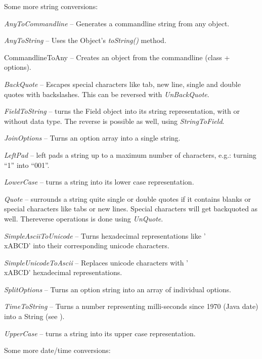 Some more string conversions:
\begin{tight_itemize}
	\item \textit{AnyToCommandline} -- Generates a commandline string from any
	object.
	\item \textit{AnyToString} -- Uses the Object's \textit{toString()} method.
	\item CommandlineToAny -- Creates an object from the commandline (class +
	options).
	\item \textit{BackQuote} -- Escapes special characters like tab, new line, 
	single and double quotes with backslashes. This can be reversed with 
	\textit{UnBackQuote}.
	\item \textit{FieldToString} -- turns the Field object into its string
	representation, with or without data type. The reverse is possible as well,
	using \textit{StringToField}.
	\item \textit{JoinOptions} -- Turns an option array into a single string.
	\item \textit{LeftPad} -- left pads a string up to a maximum number of
	characters, e.g.: turning ``1'' into ``001''.
	\item \textit{LowerCase} -- turns a string into its lower case representation.
	\item \textit{Quote} -- surrounds a string quite single or double quotes
	if it contains blanks or special characters like tabs or new lines. Special
	characters will get backquoted as well. Thereverse operations is done 
	using \textit{UnQuote}.
	\item \textit{SimpleAsciiToUnicode} -- Turns hexadecimal representations
	like '\\xABCD' into their corresponding unicode characters.
	\item \textit{SimpleUnicodeToAscii} -- Replaces unicode characters with
	'\\xABCD' hexadecimal representations.
	\item \textit{SplitOptions} -- Turns an option string into an array of individual options.
	\item \textit{TimeToString} -- Turns a number representing milli-seconds since
	1970 (Java date) into a String (see \cite{dateformat}).
	\item \textit{UpperCase} -- turns a string into its upper case representation.
\end{tight_itemize}
Some more date/time conversions:
